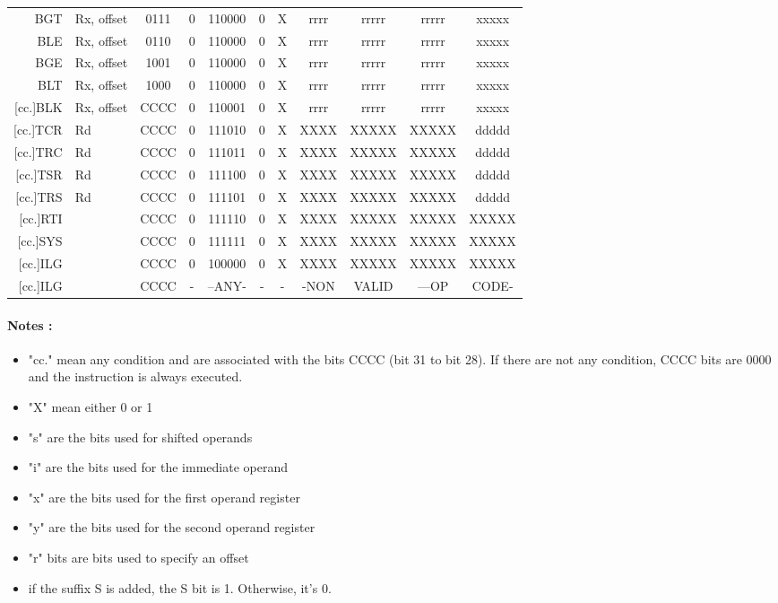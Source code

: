 \documentclass{article}
\begin{document}
\begin{longtable}{|r|l|c|c|c|c|c|ccc|c|}
    BGT & Rx, offset & 0111 & 0 & 110000 & 0 & X & rrrr & rrrrr & rrrrr & xxxxx \\
    BLE & Rx, offset & 0110 & 0 & 110000 & 0 & X & rrrr & rrrrr & rrrrr & xxxxx \\
    BGE & Rx, offset & 1001 & 0 & 110000 & 0 & X & rrrr & rrrrr & rrrrr & xxxxx \\
    BLT & Rx, offset & 1000 & 0 & 110000 & 0 & X & rrrr & rrrrr & rrrrr & xxxxx \\
    \hline
    {[}cc.]BLK & Rx, offset & CCCC & 0 & 110001 & 0 & X & rrrr & rrrrr & rrrrr & xxxxx \\
    \hline
    {[}cc.]TCR & Rd & CCCC & 0 & 111010 & 0 & X & XXXX & XXXXX & XXXXX & ddddd \\
    {[}cc.]TRC & Rd & CCCC & 0 & 111011 & 0 & X & XXXX & XXXXX & XXXXX & ddddd \\
    \hline
    {[}cc.]TSR & Rd & CCCC & 0 & 111100 & 0 & X & XXXX & XXXXX & XXXXX & ddddd \\
    {[}cc.]TRS & Rd & CCCC & 0 & 111101 & 0 & X & XXXX & XXXXX & XXXXX & ddddd \\
    \hline
    {[}cc.]RTI & & CCCC & 0 & 111110 & 0 & X & XXXX & XXXXX & XXXXX & XXXXX \\
    \hline
    {[}cc.]SYS & & CCCC & 0 & 111111 & 0 & X & XXXX & XXXXX & XXXXX & XXXXX \\
    \hline
    {[}cc.]ILG & & CCCC & 0 & 100000 & 0 & X & XXXX & XXXXX & XXXXX & XXXXX \\
    {[}cc.]ILG & & CCCC & - & --ANY- & - & - & -NON & VALID & ---OP & CODE- \\

\end{longtable}

\paragraph{Notes : }
\begin{itemize}
    \item "cc." mean any condition and are associated with the bits CCCC (bit 31 to bit 28). 
        If there are not any condition, CCCC bits are 0000 and the instruction is always executed.
    \item "X" mean either 0 or 1
    \item "s" are the bits used for shifted operands
    \item "i" are the bits used for the immediate operand
    \item "x" are the bits used for the first operand register
    \item "y" are the bits used for the second operand register
    \item "r" bits are bits used to specify an offset
    \item if the suffix S is added, the S bit is 1. Otherwise, it's 0.

\end{itemize}
\end{document}
